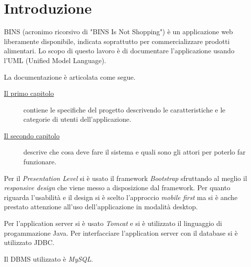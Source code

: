 
\cleardoublepage
{}

\chapter*{Introduzione}

BINS (acronimo ricorsivo di "BINS Is Not Shopping") è un applicazione web liberamente disponibile, indicata soprattutto per commercializzare prodotti alimentari. Lo scopo di questo lavoro è di documentare l'applicazione usando l'UML (Unified Model Language).

La documentazione è articolata come segue.

\begin{description}
	\item[{\hyperref[cap:specifiche-progetto]{Il primo capitolo}}]
	contiene le specifiche del progetto descrivendo le caratteristiche e le categorie di utenti dell'applicazione.
	\item[{\hyperref[cap:modello-casi-d'uso]{Il secondo capitolo}}]
	descrive che cosa deve fare il sistema e quali sono gli attori per poterlo far funzionare.
\end{description}

Per il \emph{Presentation Level} si è usato il framework \emph{Bootstrap} sfruttando al meglio il \emph{responsive design} che viene messo a disposizione dal framework. Per quanto riguarda l'usabilità e il design si è scelto l'approccio \emph{mobile first} ma si è anche prestato attenzione all'uso dell'applicazione in modalità desktop.

Per l'application server si è usato \emph{Tomcat} e si è utilizzato il linguaggio di progammazione Java.
 Per interfacciare l'application server con il database si è utilizzato JDBC.
 
Il DBMS utilizzato è \emph{MySQL}.